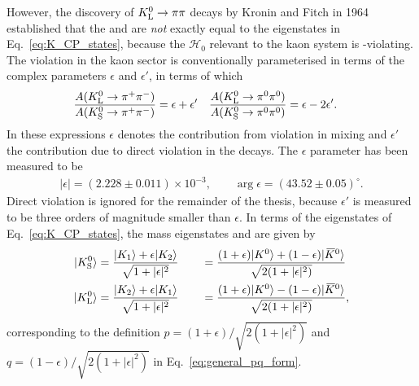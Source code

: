 However, the discovery of ${{K}^0_{\mathrm{L}}}\rightarrow\pi\pi$ decays by Kronin and Fitch in 1964 established that the \KS and \KL are \emph{not} exactly equal to the \CP eigenstates in Eq.~\eqref{eq:K_CP_states}, because the $\mathcal H_0$ relevant to the kaon system is \CP-violating. The \CP violation in the kaon sector is conventionally parameterised in terms of the complex parameters $\epsilon$ and $\epsilon'$, in terms of which
\begin{align}
    \frac{A({{K}^0_{\mathrm{L}}}\rightarrow{\ensuremath{{\pi}^+}}{\ensuremath{{\pi}^-}})}{A({{K}^0_{\mathrm{S}}}\rightarrow{\ensuremath{{\pi}^+}}{\ensuremath{{\pi}^-}})} &= \epsilon + \epsilon' &
    \frac{A({{K}^0_{\mathrm{L}}}\rightarrow{\ensuremath{{\pi}^0}}{\ensuremath{{\pi}^0}})}{A({{K}^0_{\mathrm{S}}}\rightarrow{\ensuremath{{\pi}^0}}{\ensuremath{{\pi}^0}})} &= \epsilon -2 \epsilon'. 
\end{align}
In these expressions $\epsilon$ denotes the contribution from \CP violation in mixing and $\epsilon'$ the contribution due to direct \CP violation in the decays.  The $\epsilon$ parameter has been measured to be~\cite{PDG2020}  
\begin{align}\label{eq:PDG_epsilon}
    |\epsilon|=(2.228\pm 0.011)\times 10^{-3}, \qquad \arg \epsilon = (43.52\pm 0.05)^\circ.
\end{align}
Direct \CP violation is ignored for the remainder of the thesis, because $\epsilon'$ is measured to be three orders of magnitude smaller than $\epsilon$. In terms of the \CP eigenstates of Eq.~\eqref{eq:K_CP_states}, the mass eigenstates \KS and \KL are given by
\begin{align}
\begin{split}
    |{{K}^0_{\mathrm{S}}}\rangle   &= \frac{|K_1\rangle + \epsilon |K_2\rangle}{\sqrt{ 1+|\epsilon|^2}} 
     \qquad= \frac{(1+\epsilon)|{{K}^0}\rangle + (1-\epsilon)|{{\kern 0.18em\overline{\kern -0.18em K}}{}^0}\rangle}{\sqrt{2(1+|\epsilon|^2)}} 
    \\
    |{{K}^0_{\mathrm{L}}}\rangle   &= \frac{|K_2\rangle + \epsilon |K_1\rangle}{\sqrt{ 1+|\epsilon|^2}} 
     \qquad= \frac{(1+\epsilon)|{{K}^0}\rangle - (1-\epsilon)|{{\kern 0.18em\overline{\kern -0.18em K}}{}^0}\rangle}{\sqrt{2(1+|\epsilon|^2)}},
\end{split}
\end{align}
corresponding to the definition $p=(1+\epsilon)/\sqrt{2(1+|\epsilon|^2)}$ and $q=(1-\epsilon)/\sqrt{2(1+|\epsilon|^2)}$ in Eq.~\eqref{eq:general_pq_form}.




